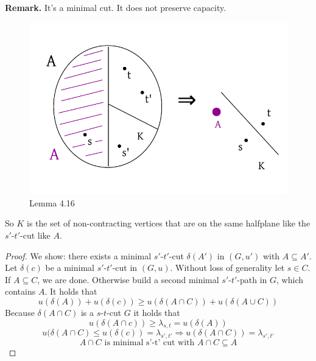 \documentclass{article}
\begin{document}
\textbf{Remark.}
  It's a minimal cut. It does not preserve capacity.

\begin{figure}[ht]
 \begin{center}
  \includegraphics{img/lemma_4_16.pdf}
  \caption{Lemma 4.16}
 \end{center}
\end{figure}

So $K$ is the set of non-contracting vertices that are on the same halfplane like the $s'$-$t'$-cut like $A$.

\begin{proof}
  We show: there exists a minimal $s'$-$t'$-cut $\delta(A')$ in $(G, u')$ with $A \subseteq A'$.
  Let $\delta(c)$ be a minimal $s'$-$t'$-cut in $(G, u)$. Without loss of generality let $s \in C$.
  If $A \subseteq C$, we are done. Otherwise build a second minimal $s'$-$t'$-path in $G$, which contains $A$.
  It holds that
  \[
    u(\delta(A)) + u(\delta(c)) \geq u(\delta(A \cap C)) + u(\delta(A \cup C))
  \]
  Because $\delta(A \cap C)$ is a $s$-$t$-cut $G$ it holds that
  \[
    u(\delta(A \cap c)) \geq \lambda_{s,t} = u(\delta(A))
  \] \[
    u(\delta(A \cap C) \leq u(\delta(c)) = \lambda_{s',t'} \Rightarrow u(\delta(A \cap C)) = \lambda_{s',t'}
  \] \[
    A \cap C \text{ is minimal s'-t' cut with } A \cap C \subseteq A
  \]
\end{proof}
\end{document}
